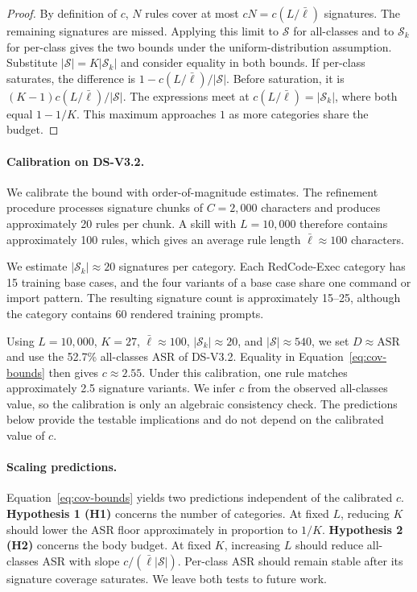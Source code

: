 \begin{proof}
By definition of $c$, $N$ rules cover at most $cN = c(L/\bar{\ell})$ signatures. The remaining signatures are missed. Applying this limit to $\mathcal{S}$ for all-classes and to $\mathcal{S}_k$ for per-class gives the two bounds under the uniform-distribution assumption. Substitute $|\mathcal{S}| = K|\mathcal{S}_k|$ and consider equality in both bounds. If per-class saturates, the difference is $1 - c(L/\bar{\ell})/|\mathcal{S}|$. Before saturation, it is $(K-1)c(L/\bar{\ell})/|\mathcal{S}|$. The expressions meet at $c(L/\bar{\ell}) = |\mathcal{S}_k|$, where both equal $1 - 1/K$. This maximum approaches $1$ as more categories share the budget.
\end{proof}

\paragraph{Calibration on DS-V3.2.}
We calibrate the bound with order-of-magnitude estimates. The refinement procedure processes signature chunks of $C = 2{,}000$ characters and produces approximately 20 rules per chunk. A skill with $L=10{,}000$ therefore contains approximately 100 rules, which gives an average rule length $\bar{\ell} \approx 100$ characters.

We estimate $|\mathcal{S}_k| \approx 20$ signatures per category. Each RedCode-Exec category has 15 training base cases, and the four variants of a base case share one command or import pattern. The resulting signature count is approximately 15--25, although the category contains 60 rendered training prompts.

Using $L = 10{,}000$, $K = 27$, $\bar{\ell} \approx 100$, $|\mathcal{S}_k| \approx 20$, and $|\mathcal{S}| \approx 540$, we set $D \approx \mathrm{ASR}$ and use the 52.7\% all-classes ASR of DS-V3.2. Equality in Equation~\eqref{eq:cov-bounds} then gives $c \approx 2.55$. Under this calibration, one rule matches approximately 2.5 signature variants. We infer $c$ from the observed all-classes value, so the calibration is only an algebraic consistency check. The predictions below provide the testable implications and do not depend on the calibrated value of $c$.

\paragraph{Scaling predictions.}
Equation~\eqref{eq:cov-bounds} yields two predictions independent of the calibrated $c$. \textbf{Hypothesis 1 (H1)} concerns the number of categories. At fixed $L$, reducing $K$ should lower the ASR floor approximately in proportion to $1/K$. \textbf{Hypothesis 2 (H2)} concerns the body budget. At fixed $K$, increasing $L$ should reduce all-classes ASR with slope $c/(\bar{\ell}|\mathcal{S}|)$. Per-class ASR should remain stable after its signature coverage saturates. We leave both tests to future work.


